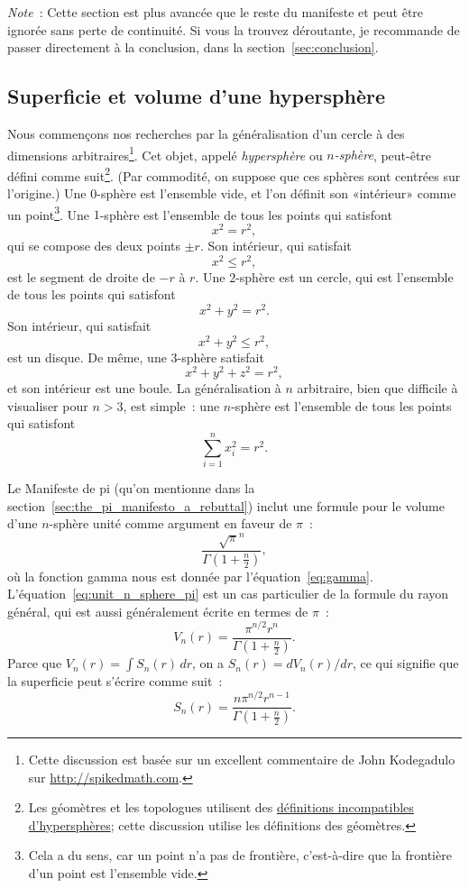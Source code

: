 \emph{Note}~: Cette section est plus avancée que le reste du manifeste et peut
être ignorée sans perte de continuité. Si vous la trouvez déroutante, je
recommande de passer directement à la conclusion, dans la
section~\ref{sec:conclusion}.

  \subsection{Superficie et volume d'une hypersphère} %
  \label{sec:volume_of_a_hypersphere}

Nous commençons nos recherches par la généralisation d'un cercle à des
dimensions arbitraires\ns\footnote{Cette discussion est basée sur un excellent
commentaire de John Kodegadulo sur \url{http://spikedmath.com}.}. Cet objet,
appelé \emph{hypersphère} ou \emph{$n$-sphère}, peut-être défini comme
suit\ns\footnote{Les géomètres et les topologues utilisent des
\href{https://translate.google.com/translate?sl=en&tl=fr&u=https://mathworld.wolfram.com/Hypersphere.html}{définitions
incompatibles d'hypersphères}\ns; cette discussion utilise les définitions des
géomètres.}. (Par commodité, on suppose que ces sphères sont centrées sur
l'origine.) Une $0$-sphère est l'ensemble vide, et l'on définit son
«\ns intérieur\ns » comme un point\ns\footnote{Cela a du sens, car un point n'a pas
de frontière, c'est-à-dire que la frontière d'un point est l'ensemble vide.}.
Une $1$-sphère est l'ensemble de tous les points qui satisfont
\[
x^2 = r^2,
\]
qui se compose des deux points $\pm r$. Son intérieur, qui satisfait
\[
x^2 \leq r^2,
\]
est le segment de droite de $-r$ à $r$. Une $2$-sphère est un cercle, qui est
l'ensemble de tous les points qui satisfont
\[
x^2 + y^2 = r^2.
\]
Son intérieur, qui satisfait
\[
x^2 + y^2 \leq r^2,
\]
est un disque. De même, une $3$-sphère satisfait
\[
x^2 + y^2 + z^2 = r^2,
\]
et son intérieur est une boule. La généralisation à $n$ arbitraire, bien que
difficile à visualiser pour $n > 3$, est simple~: une $n$-sphère est l'ensemble
de tous les points qui satisfont
\[
\sum_{i=1}^{n} x_i^2 = r^2.
\]

Le Manifeste de pi (qu'on mentionne dans la
section~\ref{sec:the_pi_manifesto_a_rebuttal}) inclut une formule pour le volume
d'une $n$-sphère unité comme argument en faveur de $\pi$~:
\begin{equation}
\label{eq:unit_n_sphere_pi}
\frac{\sqrt{\pi}^{n} }{\Gamma(1 + \frac{n}{2})},
\end{equation}
où la fonction gamma nous est donnée par l'équation~\eqref{eq:gamma}.
L'équation~\eqref{eq:unit_n_sphere_pi} est un cas particulier de la formule du
rayon général, qui est aussi généralement écrite en termes de $\pi$~:
\begin{equation}
\label{eq:n_sphere_pi}
V_n(r) = \frac{\pi^{n/2} r^n}{\Gamma(1 + \frac{n}{2})}.
\end{equation}
Parce que $V_n(r) = \int S_n(r)\,dr$, on a $S_n(r) = dV_n(r)/dr$, ce qui
signifie que la superficie peut s'écrire comme suit~:
\begin{equation}
\label{eq:n_sphere_pi_r}
S_n(r) = \frac{n \pi^{n/2} r^{n-1}}{\Gamma(1 + \frac{n}{2})}.
\end{equation}

